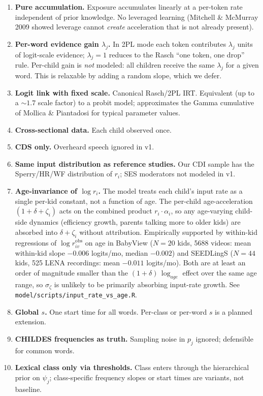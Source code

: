 \documentclass[11pt]{article}
\begin{document}
\begin{enumerate}[leftmargin=1.3em]
\item \textbf{Pure accumulation.} Exposure accumulates linearly at a
  per-token rate independent of prior knowledge. No leveraged learning
  (Mitchell \& McMurray 2009 showed leverage cannot \emph{create}
  acceleration that is not already present).
\item \textbf{Per-word evidence gain \(\lambda_j\).} In 2PL mode each
  token contributes \(\lambda_j\) units of logit-scale evidence;
  \(\lambda_j = 1\) reduces to the Rasch ``one token, one drop'' rule.
  Per-child gain is \emph{not} modeled: all children receive the same
  \(\lambda_j\) for a given word. This is relaxable by adding a random
  slope, which we defer.
\item \textbf{Logit link with fixed scale.} Canonical Rasch/2PL IRT.
  Equivalent (up to a \(\sim\!1.7\) scale factor) to a probit model;
  approximates the Gamma cumulative of Mollica \& Piantadosi for typical
  parameter values.
\item \textbf{Cross-sectional data.} Each child observed once.
\item \textbf{CDS only.} Overheard speech ignored in v1.
\item \textbf{Same input distribution as reference studies.} Our CDI
  sample has the Sperry/HR/WF distribution of $r_i$; SES moderators not
  modeled in v1.
\item \textbf{Age-invariance of \(\log r_i\).} The model treats each
  child's input rate as a single per-kid constant, not a function of
  age. The per-child age-acceleration \((1 + \delta + \zeta_i)\) acts
  on the combined product \(r_i \cdot \alpha_i\), so any age-varying
  child-side dynamics (efficiency growth, parents talking more to
  older kids) are absorbed into \(\delta + \zeta_i\) without
  attribution. Empirically supported by within-kid regressions of
  \(\log r_{iv}^{\mathrm{obs}}\) on age in BabyView (\(N=20\) kids,
  5688 videos: mean within-kid slope \(-0.006\) logits/mo,
  median \(-0.002\)) and SEEDLingS (\(N=44\) kids, 525 LENA
  recordings: mean \(-0.011\) logits/mo). Both are at least an order
  of magnitude smaller than the \((1+\delta)\,\log_{age}\) effect over
  the same age range, so \(\sigma_\zeta\) is unlikely to be primarily
  absorbing input-rate growth. See \texttt{model/scripts/input\_rate\_vs\_age.R}.
\item \textbf{Global $s$.} One start time for all words. Per-class or
  per-word $s$ is a planned extension.
\item \textbf{CHILDES frequencies as truth.} Sampling noise in $p_j$
  ignored; defensible for common words.
\item \textbf{Lexical class only via thresholds.} Class enters through
  the hierarchical prior on $\psi_j$; class-specific frequency slopes or
  start times are variants, not baseline.
\end{enumerate}
\end{document}
